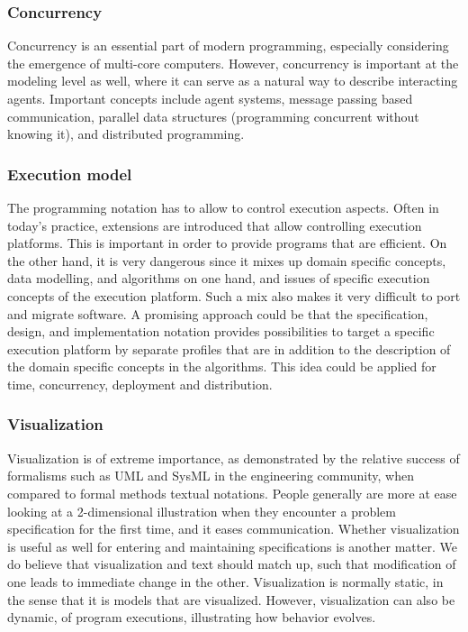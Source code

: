 \subsubsection{Concurrency}

Concurrency is an essential part of modern programming, especially 
considering the emergence of multi-core computers. However, 
concurrency is important at the modeling level as well, where it 
can serve as a natural way to describe interacting agents. 
Important concepts include agent systems, message passing based 
communication, parallel data structures (programming concurrent 
without knowing it), and distributed programming.


\subsubsection{Execution model}

The programming notation has to allow to control execution aspects. 
Often in today’s practice, extensions are introduced that allow 
controlling execution platforms. This is important in order to 
provide programs that are efficient. On the other hand, it is very 
dangerous since it mixes up domain specific concepts,  data 
modelling, and algorithms on one hand, and issues of specific 
execution concepts of the execution platform. Such a mix also makes 
it very difficult to port and migrate software. A promising 
approach could be that the specification, design, and 
implementation notation provides possibilities to target a specific 
execution platform by separate profiles that are in addition to the 
description of the domain specific concepts in the algorithms. This 
idea could be applied for time, concurrency, deployment and 
distribution.


\subsubsection{Visualization}

Visualization is of extreme importance, as demonstrated by the relative success of
formalisms such as UML and SysML in the engineering community, when compared 
to formal methods textual notations. People generally are more at ease looking at
a 2-dimensional illustration when they encounter a problem specification for the first
time, and it eases communication. Whether visualization is useful as well for entering
and maintaining specifications is another matter. We do believe that visualization and 
text should match up, such that modification of one leads to immediate change in the 
other. Visualization is normally static, in the sense that it is models that are 
visualized. However, visualization can also be dynamic, of program executions, 
illustrating how behavior evolves.



